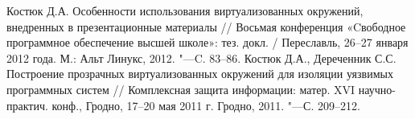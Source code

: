 \documentclass[10pt, a5paper]{article}
\begin{document}
\begin{thebibliography}{9}
 Костюк Д.А. Особенности использования виртуализованных окружений, внедренных в презентационные материалы // Восьмая конференция «Cвободное программное обеспечение высшей школе»: тез. докл. / Переславль, 26--27 января 2012  года. М.: Альт Линукс, 2012. "---C. 83--86.
 Костюк Д.А., Дереченник С.С. Построение прозрачных виртуализованных окружений для изоляции уязвимых программных систем // Комплексная защита информации: матер. XVI научно-практич. конф., Гродно, 17--20 мая 2011 г. Гродно, 2011. "---С. 209--212. 
\end{thebibliography}
\end{document}
